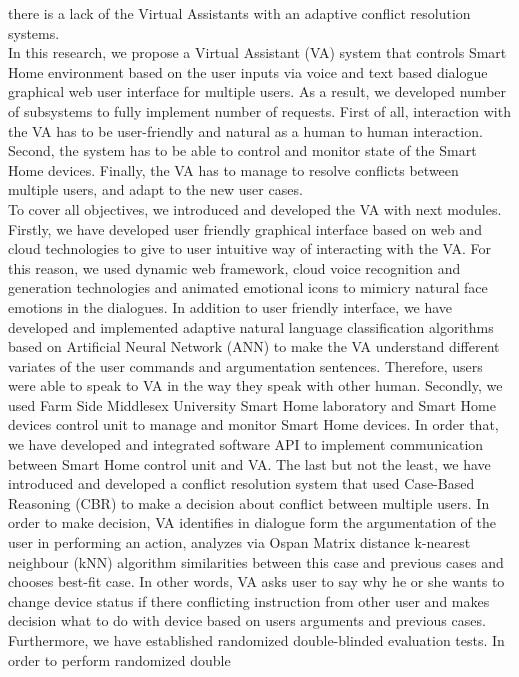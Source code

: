 \documentclass{llncs}
\begin{document}
    there is a lack of the Virtual Assistants with an adaptive conflict resolution systems. \\
    In this research, we propose a Virtual Assistant (VA) system that controls Smart Home environment based on the user inputs via
    voice and text based dialogue graphical web user interface for multiple users. As a result, we developed number of
    subsystems to fully implement number of requests. First of all, interaction with the VA has to be user-friendly and
    natural as a human to human interaction. Second, the system has to be able to control and monitor state of the Smart
    Home devices. Finally, the VA has to manage to resolve conflicts between multiple users, and adapt to the new user cases.
    \\To cover all objectives, we introduced and developed the VA with next modules. Firstly, we have developed user friendly
    graphical interface based on web and cloud technologies to give to user intuitive way of interacting with the VA. For this
    reason, we used dynamic web framework, cloud voice recognition and generation technologies and animated emotional icons
    to mimicry natural face emotions in the dialogues. In addition to user friendly interface, we have developed and implemented
    adaptive natural language classification algorithms based on Artificial Neural Network (ANN) to make the VA understand
    different variates of the user commands and argumentation sentences. Therefore, users were able to speak to
    VA in the way they speak with other human. Secondly, we used Farm Side Middlesex University Smart Home laboratory and
    Smart Home devices control unit to manage and monitor Smart Home devices. In order that, we have developed and integrated
    software API to implement communication between Smart Home control unit and VA. The last but not the least, we have
    introduced and developed a conflict resolution system that used Case-Based Reasoning (CBR) to make a decision about
    conflict between multiple users. In order to make decision, VA identifies in dialogue form the argumentation of the user
    in performing an action, analyzes via Ospan Matrix distance k-nearest neighbour (kNN) algorithm similarities between
    this case and previous cases and chooses best-fit case. In other words, VA asks user to say why he or she wants to change
    device status if there conflicting instruction from other user and makes decision what to do with device based on users
    arguments and previous cases.
    \\Furthermore, we have established randomized double-blinded evaluation tests. In order to perform randomized double
\end{document}
